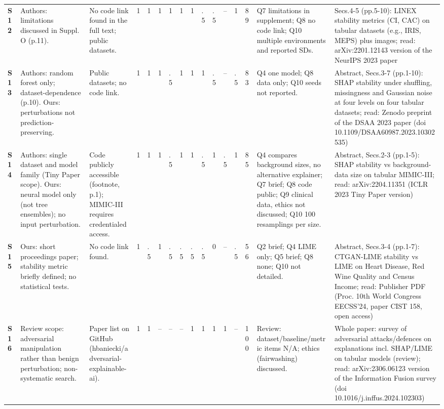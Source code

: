 \begin{longtable}{@{}P{1.0cm}P{4.6cm}P{3.6cm}P{0.3cm}P{0.3cm}P{0.3cm}P{0.3cm}P{0.3cm}P{0.3cm}P{0.3cm}P{0.3cm}P{0.3cm}P{0.36cm}P{0.75cm}P{3.0cm}P{3.9cm}@{}}
\textbf{S12} & Authors: limitations discussed in Suppl. O (p.11). & No code link found in the full text; public datasets. & 1 & 1 & 1 & 1 & 1 & 1 & .5 & .5 & -- & 1 & 89 & Q7 limitations in supplement; Q8 no code link; Q10 multiple environments and reported SDs. & Secs.4-5 (pp.5-10): LINEX stability metrics (CI, CAC) on tabular datasets (e.g., IRIS, MEPS) plus images; read: arXiv:2201.12143 version of the NeurIPS 2023 paper \\
\textbf{S13} & Authors: random forest only; dataset-dependence (p.10). Ours: perturbations not prediction-preserving. & Public datasets; no code link. & 1 & 1 & 1 & .5 & 1 & 1 & 1 & .5 & -- & .5 & 83 & Q4 one model; Q8 data only; Q10 seeds not reported. & Abstract, Secs.3-7 (pp.1-10): SHAP stability under shuffling, missingness and Gaussian noise at four levels on four tabular datasets; read: Zenodo preprint of the DSAA 2023 paper (doi 10.1109/\allowbreak{}DSAA60987.2023.10302535) \\
\textbf{S14} & Authors: single dataset and model family (Tiny Paper scope). Ours: neural model only (not tree ensembles); no input perturbation. & Code publicly accessible (footnote, p.1); MIMIC-III requires credentialed access. & 1 & 1 & 1 & .5 & 1 & 1 & .5 & 1 & .5 & 1 & 85 & Q4 compares background sizes, no alternative explainer; Q7 brief; Q8 code public; Q9 clinical data, ethics not discussed; Q10 100 resamplings per size. & Abstract, Secs.2-3 (pp.1-5): SHAP stability vs background-data size on tabular MIMIC-III; read: arXiv:2204.11351 (ICLR 2023 Tiny Paper version) \\
\textbf{S15} & Ours: short proceedings paper; stability metric briefly defined; no statistical tests. & No code link found. & 1 & .5 & 1 & .5 & .5 & .5 & .5 & 0 & -- & .5 & 56 & Q2 brief; Q4 LIME only; Q5 brief; Q8 none; Q10 not detailed. & Abstract, Secs.3-4 (pp.1-7): CTGAN-LIME stability vs LIME on Heart Disease, Red Wine Quality and Census Income; read: Publisher PDF (Proc. 10th World Congress EECSS'24, paper CIST 158, open access) \\
\textbf{S16} & Review scope: adversarial manipulation rather than benign perturbation; non-systematic search. & Paper list on GitHub (hbaniecki/\allowbreak{}adversarial-explainable-ai). & 1 & 1 & -- & -- & -- & 1 & 1 & 1 & 1 & -- & 100 & Review: dataset/\allowbreak{}baseline/\allowbreak{}metric items N/\allowbreak{}A; ethics (fairwashing) discussed. & Whole paper: survey of adversarial attacks/\allowbreak{}defences on explanations incl. SHAP/\allowbreak{}LIME on tabular models (review); read: arXiv:2306.06123 version of the Information Fusion survey (doi 10.1016/\allowbreak{}j.inffus.2024.102303) \\

\end{longtable}

